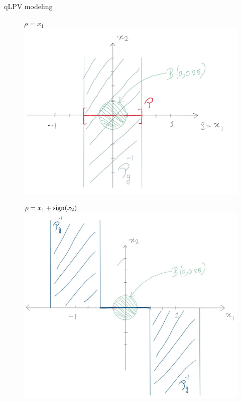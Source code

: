 \documentclass{beamer}
\begin{document}
\begin{frame}{qLPV modeling}
\begin{figure}
\begin{minipage}{.5\textwidth}
	\centering
	$\rho=x_1$
	\includegraphics[width=0.9\linewidth,height=0.43\textheight]{figures/sched_para_map_valid.jpg}
\end{minipage}%
\begin{minipage}{0.5\textwidth}
	\centering
	$\rho=x_1+\textnormal{sign}(x_2)$
	\includegraphics[width=0.9\linewidth,height=0.43\textheight]{figures/sched_para_map_invalid.jpg}
\end{minipage}
\end{figure}
\end{frame}
\end{document}
